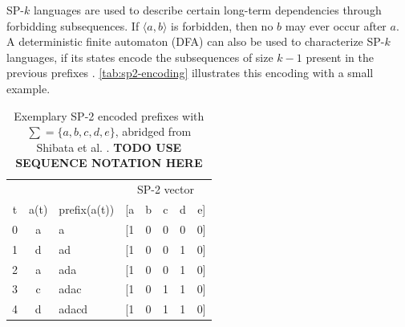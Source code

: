 SP-$k$ languages are used to describe certain long-term dependencies through forbidding subsequences. If $\langle a,b \rangle$ is forbidden, then no $b$ may ever occur after $a$. A deterministic finite automaton (DFA) can also be used to characterize SP-$k$ languages, if its states encode the subsequences of size $k-1$  present in the previous prefixes \cite{heinz2010estimatingSP}. \autoref{tab:sp2-encoding} illustrates this encoding with a small example.

\begin{table}
    \centering
    \begin{tabular}{cclccccc}
        \hline
          &      &              & \multicolumn{5}{c}{SP-2 vector}\\
        t & a(t) & prefix(a(t)) & [a & b & c & d & e]\\
        \hline
        0 & a    & a            & [1 & 0 & 0 & 0 & 0]\\
        1 & d    & ad           & [1 & 0 & 0 & 1 & 0]\\
        2 & a    & ada          & [1 & 0 & 0 & 1 & 0]\\
        3 & c    & adac         & [1 & 0 & 1 & 1 & 0]\\
        4 & d    & adacd        & [1 & 0 & 1 & 1 & 0]\\
        \hline
    \end{tabular}
    \caption{Exemplary SP-2 encoded prefixes with $\sum=\{a,b,c,d,e\}$, abridged from Shibata et al.  \cite{shibata2016bipartite}. \textbf{TODO USE SEQUENCE NOTATION HERE}}
    \label{tab:sp2-encoding}
\end{table}